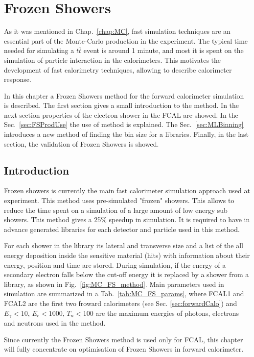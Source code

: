 \chapter{Frozen Showers}\label{chap:FS}
\minitoc


As it was mentioned in Chap.~\ref{chap:MC}, fast simulation techniques are an essential part of the Monte-Carlo production in the \atlas experiment. The typical time needed for simulating a $t\bar{t}$ event is around 1 minute, and most it is spent on the simulation of particle interaction in the calorimeters. This motivates the development of fast calorimetry techniques, allowing to describe calorimeter response.

In this chapter a Frozen Showers method for the forward calorimeter simulation is described. The first section gives a small introduction to the method. In the next section properties of the electron shower in the FCAL are showed. In the Sec.~\ref{sec:FSProdUse} the use of method is explained. The Sec.~\ref{sec:MLBinning} introduces a new method of finding the bin size for a libraries. Finally, in the last section, the validation of Frozen Showers is showed.

\section{Introduction}
Frozen showers is currently the main fast calorimeter simulation approach used at \atlas experiment\cite{FS}.  This method uses pre-simulated "frozen" showers. This allows to reduce the time spent on a simulation of a large amount of low energy sub showers. This method gives a 25\% speedup in simulation. It is required to have in advance generated libraries for each detector and particle used in this method. 

For each shower in the library its lateral and transverse size and a list of the all energy deposition inside the sensitive material (hits) with information about their energy, position and time are stored. During simulation, if the energy of a secondary electron falls below the cut-off energy it is replaced by a shower from a library, as shown in Fig.~\ref{fig:MC_FS_method}. Main parameters used in \atlas simulation are summarized in a Tab.~\ref{tab:MC_FS_params}, where FCAL1 and FCAL2 are the first two froward calorimeters (see Sec. \ref{sec:forwardCalo}) and $E_{\gamma}<10$, $E_{e}<1000$, $T_n<100$ are the maximum energies of photons, electrons and neutrons used in the method. 

Since currently the Frozen Showers method is used only for FCAL, this chapter will fully concentrate on optimisation of Frozen Showers in forward calorimeter.

